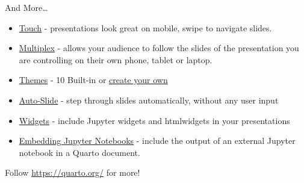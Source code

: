 \documentclass[
  ignorenonframetext,
  aspectratio=169,
]{beamer}
\providecommand{\tightlist}{%
  \setlength{\itemsep}{0pt}\setlength{\parskip}{0pt}}\usepackage{longtable,booktabs,array}
\theoremstyle{plain}
\theoremstyle{remark}
\begin{document}
\begin{frame}{And More\ldots{}}
\label{and-more}
\begin{itemize}
\tightlist
\item
  \href{https://quarto.org/docs/presentations/revealjs/advanced.html\#touch-navigation}{Touch}
  - presentations look great on mobile, swipe to navigate slides.
\item
  \href{https://quarto.org/docs/presentations/revealjs/presenting.html\#multiplex}{Multiplex}
  - allows your audience to follow the slides of the presentation you
  are controlling on their own phone, tablet or laptop.
\item
  \href{https://quarto.org/docs/presentations/revealjs/themes.html}{Themes}
  - 10 Built-in or
  \href{https://quarto.org/docs/presentations/revealjs/themes.html\#creating-themes}{create
  your own}
\item
  \href{https://quarto.org/docs/presentations/revealjs/presenting.html\#auto-slide}{Auto-Slide}
  - step through slides automatically, without any user input
\item
  \href{https://quarto.org/docs/interactive/widgets/jupyter.html}{Widgets}
  - include Jupyter widgets and htmlwidgets in your presentations
\item
  \href{https://quarto.org/docs/authoring/notebook-embed.html}{Embedding
  Jupyter Notebooks} - include the output of an external Jupyter
  notebook in a Quarto document.
\end{itemize}

Follow \url{https://quarto.org/} for more!
\end{frame}
\end{document}
